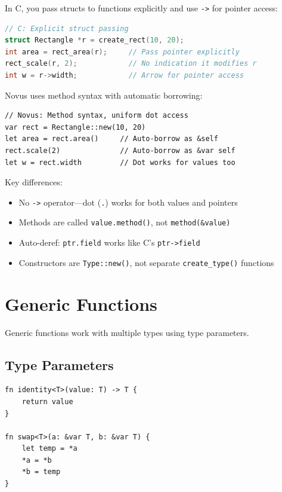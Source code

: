 \begin{comingfromc}
In C, you pass structs to functions explicitly and use \texttt{->} for pointer access:

\begin{lstlisting}[language=C]
// C: Explicit struct passing
struct Rectangle *r = create_rect(10, 20);
int area = rect_area(r);     // Pass pointer explicitly
rect_scale(r, 2);            // No indication it modifies r
int w = r->width;            // Arrow for pointer access
\end{lstlisting}

Novus uses method syntax with automatic borrowing:

\begin{lstlisting}
// Novus: Method syntax, uniform dot access
var rect = Rectangle::new(10, 20)
let area = rect.area()     // Auto-borrow as &self
rect.scale(2)              // Auto-borrow as &var self
let w = rect.width         // Dot works for values too
\end{lstlisting}

Key differences:
\begin{itemize}
    \item No \texttt{->} operator---dot (\texttt{.}) works for both values and pointers
    \item Methods are called \texttt{value.method()}, not \texttt{method(\&value)}
    \item Auto-deref: \texttt{ptr.field} works like C's \texttt{ptr->field}
    \item Constructors are \texttt{Type::new()}, not separate \texttt{create\_type()} functions
\end{itemize}
\end{comingfromc}

\section{Generic Functions}
\label{sec:generics}

Generic functions work with multiple types using type parameters.

\subsection{Type Parameters}
\label{subsec:type-params}

\begin{lstlisting}
fn identity<T>(value: T) -> T {
    return value
}

fn swap<T>(a: &var T, b: &var T) {
    let temp = *a
    *a = *b
    *b = temp
}
\end{lstlisting}

